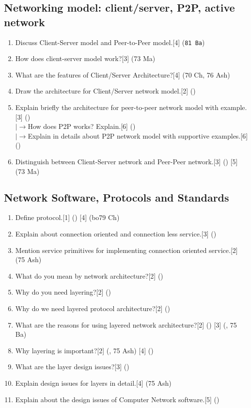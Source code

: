 \documentclass[12pt]{article}
\newcommand{\lb}{\\$\left|\rightarrow\right.$}
\begin{document}
	\subsection{Networking model: client/server, P2P, active network}
		\begin{enumerate}[noitemsep, topsep = 0pt]
			\item Discuss Client-Server model and Peer-to-Peer model.\hfill[4] (\texttt{81 Ba})
			\item How does client-server model work?\hfill[3] (73 Ma)
			\item What are the features of Client/Server Architecture?\hfill[4] (70 Ch, 76 Ash)
			\item Draw the architecture for Client/Server network model.\hfill[2] ()
			\item Explain briefly the architecture for peer-to-peer network model with example.\hfill[3] ()
			\lb How does P2P works? Explain.\hfill[6] ()
			\lb Explain in details about P2P network model with supportive examples.\hfill[6] ()
			\item Distinguish between Client-Server network and Peer-Peer network.\hfill[3] () [5] (73 Ma)
		\end{enumerate}

	\subsection{Network Software, Protocols and Standards}
		\begin{enumerate}[noitemsep, topsep = 0pt]
			\item Define protocol.\hfill[1] () [4] (bo{79 Ch}) 

			\item Explain about connection oriented and connection less service.\hfill[3] ()
			\item Mention service primitives for implementing connection oriented service.\hfill[2] (75 Ash)
			\item What do you mean by network architecture?\hfill[2] ()
			\item Why do you need layering?\hfill[2] ()
			\item Why do we need layered protocol architecture?\hfill[2] ()
			\item What are the reasons for using layered network architecture?\hfill[2] () [3] (, 75 Ba)
			\item Why layering is important?\hfill[2] (, 75 Ash) [4] ()
			\item What are the layer design issues?\hfill[3] ()
			\item Explain design issues for layers in detail.\hfill[4] (75 Ash)
			\item Explain about the design issues of Computer Network software.\hfill[5] ()
		\end{enumerate}
\end{document}
